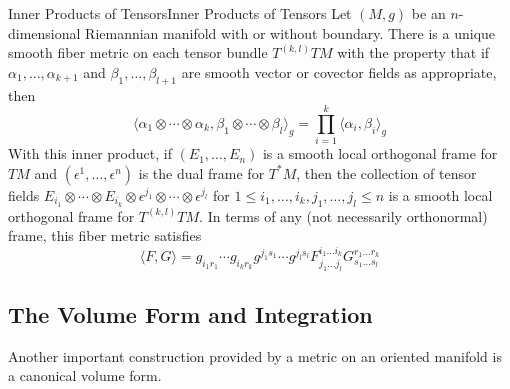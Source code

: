\documentclass[../main.tex]{subfiles}
\begin{document}
\begin{proposition}{Inner Products of Tensors}{Inner Products of Tensors}
	Let $(M, g)$ be an $n$-dimensional Riemannian manifold with or without boundary. There is a unique smooth fiber metric on each tensor bundle $T^{(k, l)}TM$ with the property that if $\alpha_1, \ldots , \alpha_{k+1}$ and $\beta_1, \ldots, \beta_{l+1}$ are smooth vector or covector fields as appropriate, then
	\begin{equation}
		\langle \alpha_1 \otimes \cdots \otimes \alpha_k, \beta_1 \otimes \cdots \otimes \beta_l \rangle_g = \prod_{i=1}^k \langle \alpha_i, \beta_i \rangle_g
	\end{equation}
	With this inner product, if $(E_1, \ldots, E_n)$ is a smooth local orthogonal frame for $TM$ and $(\epsilon^1, \ldots, \epsilon^n)$ is the dual frame for $T^*M$, then the collection of tensor fields $E_{i_1} \otimes \cdots \otimes E_{i_k} \otimes \epsilon^{j_1} \otimes \cdots \otimes \epsilon^{j_l}$ for $1 \leq i_1, \ldots, i_k, j_1, \ldots, j_l \leq n$ is a smooth local orthogonal frame for $T^{(k, l)}TM$. In terms of any (not necessarily orthonormal) frame, this fiber metric satisfies
	\begin{equation}
		\langle F, G \rangle = g_{i_1 r_1} \cdots g_{i_k r_k} g^{j_1 s_1} \cdots g^{j_l s_l} F^{i_1 \ldots i_k}_{j_1 \ldots j_l} G^{r_1 \ldots r_k}_{s_1 \ldots s_l}
	\end{equation}
\end{proposition}

\subsection{The Volume Form and Integration}
Another important construction provided by a metric on an oriented manifold is a canonical volume form.
\end{document}
